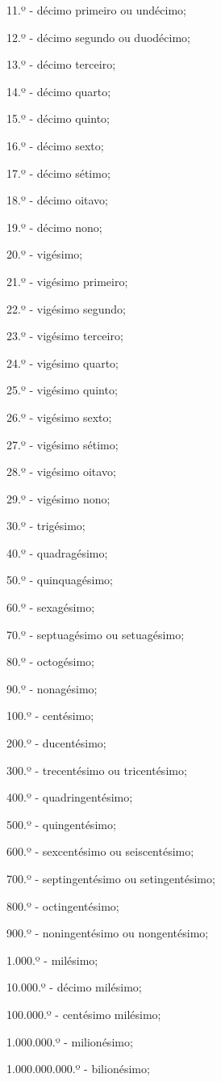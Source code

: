 \begin{multicols*}{2}
\begin{enumerate}
11.º - décimo primeiro ou undécimo;

12.º - décimo segundo ou duodécimo;

13.º - décimo terceiro;

14.º - décimo quarto;

15.º - décimo quinto;

16.º - décimo sexto;

17.º - décimo sétimo;

18.º - décimo oitavo;

19.º - décimo nono;

20.º - vigésimo;

21.º - vigésimo primeiro;

22.º - vigésimo segundo;

23.º - vigésimo terceiro;

24.º - vigésimo quarto;

25.º - vigésimo quinto;

26.º - vigésimo sexto;

27.º - vigésimo sétimo;

28.º - vigésimo oitavo;

29.º - vigésimo nono;

30.º - trigésimo;

40.º - quadragésimo;

50.º - quinquagésimo;

60.º - sexagésimo;

70.º - septuagésimo ou setuagésimo;

80.º - octogésimo;

90.º - nonagésimo;

100.º - centésimo;

200.º - ducentésimo;

300.º - trecentésimo ou tricentésimo;

400.º - quadringentésimo;

500.º - quingentésimo;

600.º - sexcentésimo ou seiscentésimo;

700.º - septingentésimo ou setingentésimo;

800.º - octingentésimo;

900.º - noningentésimo ou nongentésimo;

1.000.º - milésimo;

10.000.º - décimo milésimo;

100.000.º - centésimo milésimo;

1.000.000.º - milionésimo;

1.000.000.000.º - bilionésimo;


\end{enumerate}
\end{multicols*}
